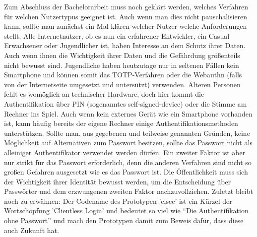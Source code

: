 Zum Abschluss der Bachelorarbeit muss noch geklärt werden, welches Verfahren für welchen Nutzertypus geeignet ist. Auch wenn man dies nicht pauschalisieren kann, sollte man zunächst ein Mal klären welcher Nutzer welche Anforderungen stellt. Alle Internetnutzer, ob es nun ein erfahrener Entwickler, ein Casual Erwachsener oder Jugendlicher ist, haben Interesse an dem Schutz ihrer Daten. Auch wenn ihnen die Wichtigkeit ihrer Daten und die Gefährdung größenteils nicht bewusst sind. Jugendliche haben heutzutage nur in seltenen Fällen kein Smartphone und können somit das TOTP-Verfahren oder die Webauthn (falls von der Internetseite umgesetzt und untersützt) verwenden. Älteren Personen fehlt es womöglich an technischer Hardware, doch hier kommt die Authentifikation über PIN (sogenanntes self-signed-device) oder die Stimme am Rechner ins Spiel. Auch wenn kein externes Gerät wie ein Smartphone vorhanden ist, kann häufig bereits der eigene Rechner einige Authentifikationsmethoden unterstützen. Sollte man, aus gegebenen und teilweise genannten Gründen, keine Möglichkeit auf Alternativen zum Passwort besitzen, sollte das Passwort nicht als alleiniger Authentifikator verwendet werden dürfen. Ein zweiter Faktor ist aber nur strikt für das Passwort erforderlich, denn die anderen Verfahren sind nicht so großen Gefahren ausgesetzt wie es das Passwort ist. Die Öffentlichkeit muss sich der Wichtigkeit ihrer Identität bewusst werden, um die Entscheidung über Passwörter und dem erzwungenen zweiten Faktor nachzuvollziehen. Zuletzt bleibt noch zu erwähnen: Der Codename des Prototypen 'clsec' ist ein Kürzel der Wortschöpfung 'Clientless Login' und bedeutet so viel wie ``Die Authentifikation ohne Passwort'' und mach den Prototypen damit zum Beweis dafür, dass diese auch Zukunft hat.
